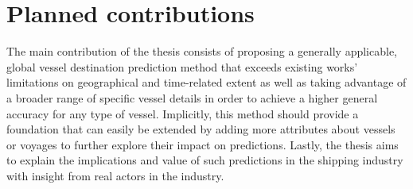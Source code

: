 \section{Planned contributions}

The main contribution of the thesis consists of proposing a generally applicable, global vessel destination prediction method that exceeds existing works' limitations on geographical and time-related extent as well as taking advantage of a broader range of specific vessel details in order to achieve a higher general accuracy for any type of vessel. Implicitly, this method should provide a foundation that can easily be extended by adding more attributes about vessels or voyages to further explore their impact on predictions. Lastly, the thesis aims to explain the implications and value of such predictions in the shipping industry with insight from real actors in the industry.
